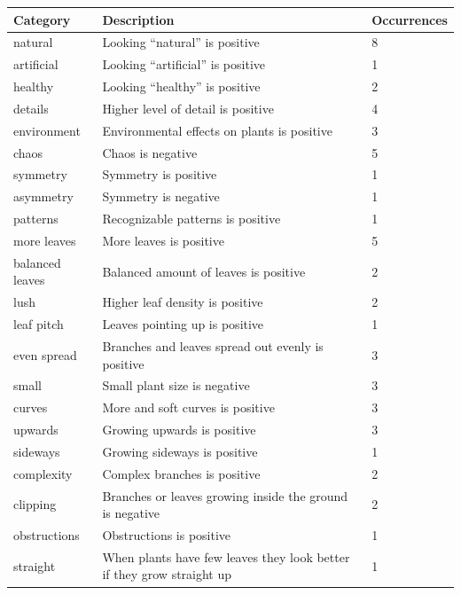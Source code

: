 \begin{table}
    \centering
    \begin{tabularx}{\textwidth}{| l | X | l |}
    \hline
    \textbf{Category} & \textbf{Description} & \textbf{Occurrences} \\
    \hline
    natural & Looking ``natural'' is positive & 8 \\
    \hline
    artificial & Looking ``artificial'' is positive & 1 \\
    \hline
    healthy & Looking ``healthy'' is positive & 2 \\
    \hline
    details & Higher level of detail is positive & 4 \\
    \hline
    environment & Environmental effects on plants is positive & 3 \\
    \hline
    chaos & Chaos is negative & 5 \\
    \hline
    symmetry & Symmetry is positive & 1 \\
    \hline
    asymmetry & Symmetry is negative & 1 \\
    \hline
    patterns & Recognizable patterns is positive & 1 \\
    \hline
    more leaves & More leaves is positive & 5 \\
    \hline
    balanced leaves & Balanced amount of leaves is positive & 2 \\
    \hline
    lush & Higher leaf density is positive & 2 \\
    \hline
    leaf pitch & Leaves pointing up is positive & 1 \\
    \hline
    even spread & Branches and leaves spread out evenly is positive & 3 \\
    \hline
    small & Small plant size is negative & 3 \\
    \hline
    curves & More and soft curves is positive & 3 \\
    \hline
    upwards & Growing upwards is positive & 3 \\
    \hline
    sideways & Growing sideways is positive & 1 \\
    \hline
    complexity & Complex branches is positive & 2 \\
    \hline
    clipping & Branches or leaves growing inside the ground is negative & 2 \\
    \hline
    obstructions & Obstructions is positive & 1 \\
    \hline
    straight & When plants have few leaves they look better if they grow straight up & 1 \\

\end{tabularx}
\end{table}
